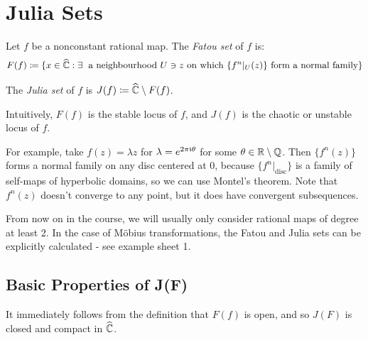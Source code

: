 \documentclass[10pt,a4paper]{article}
\begin{document}
\section{Julia Sets}
\begin{definition}
  Let $f$ be a nonconstant rational map. The \emph{Fatou set} of $f$ is:
  \[F(f) \coloneqq \{x \in \hat\C : \exists \text{ a neighbourhood } U \ni z\text{ on which }\{f^n|_U(z)\}\text{ form a normal family}\}\]

  The \emph{Julia set} of $f$ is $J(f) \coloneqq \widehat{\mathbb{C}}\setminus F(f)$.
\end{definition}
Intuitively, $F(f)$ is the stable locus of $f$, and $J(f)$ is the chaotic or unstable locus of $f$.

For example, take $f(z) = \lambda z$ for $\lambda = e^{2\pi\mathfrak{i}\theta}$ for some $\theta \in \mathbb{R}\setminus \mathbb{Q}$. Then $\{f^n(z)\}$ forms a normal family on any disc centered at $0$, because $\{f^n|_{\text{disc}}\}$ is a family of self-maps of hyperbolic domains, so we can use Montel's theorem. Note that $f^n(z)$ doesn't converge to any point, but it does have convergent subsequences.

\begin{figure}[H]
  \centering
\end{figure}
From now on in the course, we will usually only consider rational maps of degree at least 2. In the case of M\"obius transformations, the Fatou and Julia sets can be explicitly calculated - see example sheet 1.

\subsection{Basic Properties of J(F)}
It immediately follows from the definition that $F(f)$ is open, and so $J(F)$ is closed and compact in $\widehat{\mathbb{C}}$.
\end{document}

